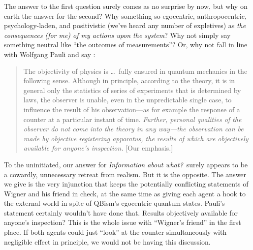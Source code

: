 \documentclass[aps,pra,superscriptaddress,10pt,tightenlines,twocolumn,nofootinbib]{revtex4}
\begin{document}
The answer to the first question surely comes as no surprise by now, but why on earth the answer for the second?   Why something so egocentric, anthro\-po\-centric, psychology-laden, and positivistic (we've heard any number of expletives) as {\it the consequences (for me) of my actions upon the system}?  Why not simply say something neutral like ``the outcomes of measurements''?  Or, why not fall in line with Wolfgang Pauli and say \cite{Pauli94}:
\begin{quote}
The objectivity of physics is \ldots\ fully ensured in quantum mechanics in the following sense.  Although in principle, according to the theory, it is in general only the statistics of series of experiments that is determined by laws, the observer is unable, even in the unpredictable single case, to influence the result of his observation---as for example the response of a counter at a particular instant of time.  {\it Further, personal qualities of the observer do not come into the theory in any way---the observation can be made by objective registering apparatus, the results of which are objectively available for anyone's inspection.}  [Our emphasis.]
\end{quote}
To the uninitiated, our answer for {\it Information about what?}\ surely appears to be a cowardly, unnecessary retreat from realism.  But it is the opposite.  The answer we give is the very injunction that keeps the potentially conflicting statements of Wigner and his friend in check,  at the same time as giving each agent a hook to the external world in spite of QBism's egocentric quantum states.  Pauli's statement certainly wouldn't have done that.  Results objectively available for anyone's inspection?  This is the whole issue with ``Wigner's friend'' in the first place.  If both agents could just ``look'' at the counter simultaneously with negligible effect in principle, we would not be having this discussion.
\end{document}
